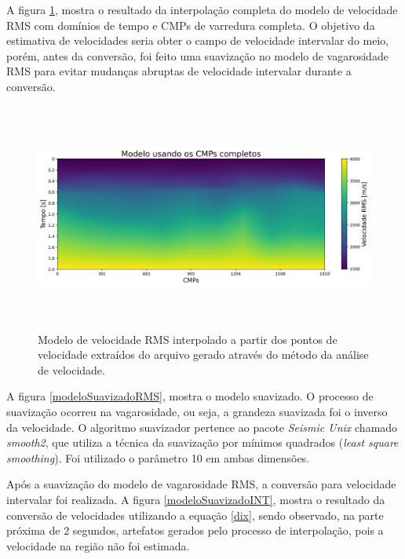 \documentclass[
	12pt,				%
	openright,			%
	oneside,			%
	a4paper,			%
	english,			%
	brazil				%
	]{abntex2}
\begin{document}
	A figura \ref{modeloRMSCMPsCompletos}, mostra o resultado da interpolação completa do modelo de velocidade RMS com domínios de tempo e CMPs de varredura completa. O objetivo da estimativa de velocidades seria obter o campo de velocidade intervalar do meio, porém, antes da conversão, foi feito uma suavização no modelo de vagarosidade RMS para evitar mudanças abruptas de velocidade intervalar durante a conversão.  

    \begin{figure}[htp!]
		\centering
		\includegraphics[width=16cm,height=7.5cm]{../imagens/modeloCompleto.png}
		\caption{Modelo de velocidade RMS interpolado a partir dos pontos de velocidade extraídos do arquivo gerado através do método da análise de velocidade.}
		\label{modeloRMSCMPsCompletos}
	\end{figure}

	A figura \ref{modeloSuavizadoRMS}, mostra o modelo suavizado. O processo de suavização ocorreu na vagarosidade, ou seja, a grandeza suavizada foi o inverso da velocidade. O algoritmo suavizador pertence ao pacote \textit{Seismic Unix} chamado \textit{smooth2}, que utiliza a técnica da suavização por mínimos quadrados (\textit{least square smoothing}). Foi utilizado o parâmetro 10 em ambas dimensões.   

	Após a suavização do modelo de vagarosidade RMS, a conversão para velocidade intervalar foi realizada. A figura \ref{modeloSuavizadoINT}, mostra o resultado da conversão de velocidades utilizando a equação \ref{dix}, sendo observado, na parte próxima de 2 segundos, artefatos   gerados pelo processo de interpolação, pois a velocidade na região não foi estimada.
\end{document}
